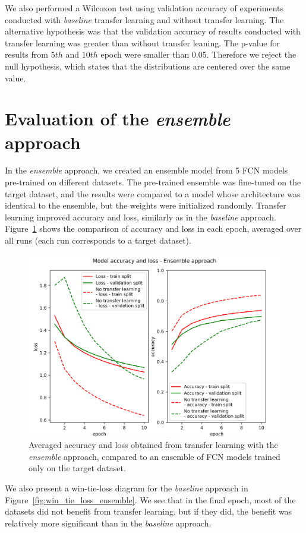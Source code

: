 \documentclass[a4paper,11pt,twoside]{report}
\theoremstyle{definition}
\begin{document}
\FloatBarrier
We also performed a Wilcoxon test using validation accuracy of experiments conducted with \textit{baseline} transfer learning and without transfer learning. The alternative hypothesis was that the validation accuracy of results conducted with transfer learning was greater than without transfer leaning. The p-value for results from $5th$ and $10th$ epoch were smaller than 0.05. Therefore we reject the null hypothesis, which states that the distributions are centered over the same value.
\section{Evaluation of the \textit{ensemble} approach}
In the \textit{ensemble} approach, we created an ensemble model from 5 FCN models pre-trained on different datasets. The pre-trained ensemble was fine-tuned on the target dataset, and the results were compared to a model whose architecture was identical to the ensemble, but the weights were initialized randomly. Transfer learning improved accuracy and loss, similarly as in the \textit{baseline} approach. Figure~\ref{fig:ensemble_acc} shows the comparison of accuracy and loss in each epoch, averaged over all runs (each run corresponds to a target dataset).

\FloatBarrier

\begin{figure}[h!t]
\centering
\includegraphics[width=17 cm]{imgs/ensemble/loss_acc.png}
\caption{Averaged accuracy and loss obtained from transfer learning with the \textit{ensemble} approach, compared to an ensemble of FCN models trained only on the target dataset.}
\label{fig:ensemble_acc}
\end{figure}
\FloatBarrier
We also present a win-tie-loss diagram for the \textit{baseline} approach in Figure~\ref{fig:win_tie_loss_ensemble}. We see that in the final epoch, most of the datasets did not benefit from transfer learning, but if they did, the benefit was relatively more significant than in the \textit{baseline} approach.
\end{document}
